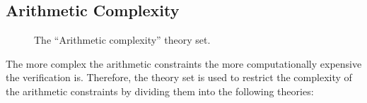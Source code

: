 \subsection{Arithmetic Complexity}
\label{sec:arithmetic-complexity}

\begin{figure}[h]
\centering
{}
\caption{The ``Arithmetic complexity'' theory set.}
\label{fig:arithmetic-complexities}
\end{figure}

The more complex the arithmetic constraints the more computationally expensive the verification is. Therefore, the \arithComplexity{} theory set is used to restrict the complexity of the arithmetic constraints by dividing them into the following theories:

